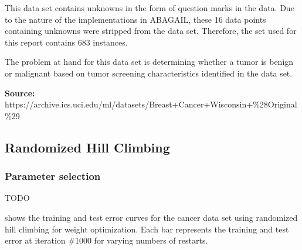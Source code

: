\documentclass{article}
\begin{document}
        This data set contains unknowns in the form of question marks in the data. Due to the nature of the implementations in ABAGAIL, these 16 data points containing unknowns were stripped from the data set. Therefore, the set used for this report contains 683 instances.

        The problem at hand for this data set is determining whether a tumor is benign or malignant based on tumor screening characteristics identified in the data set.

        \textbf{Source:} https://archive.ics.uci.edu/ml/datasets/Breast+Cancer+Wisconsin+\%28Original\%29

    \subsection{Randomized Hill Climbing}

      \subsubsection{Parameter selection}
        TODO

         shows the training and test error curves for the cancer data set using randomized hill climbing for weight optimization. Each bar represents the training and test error at iteration \#1000 for varying numbers of restarts.
\end{document}
